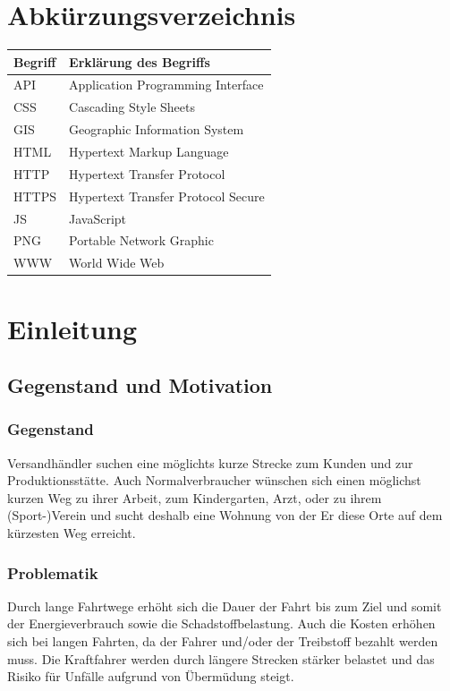 \documentclass[a4paper, 12pt]{scrreprt}
\begin{document}
\chapter*{Abkürzungsverzeichnis}
\begin{tabularx}{\textwidth}{lX}
\toprule
\textrm{Begriff}                &\textrm{Erklärung des Begriffs}\\
\midrule
API		&Application Programming Interface\\
CSS		&Cascading Style Sheets\\
GIS		&Geographic Information System \\
HTML	&Hypertext Markup Language\\
HTTP	&Hypertext Transfer Protocol\\
HTTPS	&Hypertext Transfer Protocol Secure\\
JS		&JavaScript\\
PNG		&Portable Network Graphic\\
WWW		&World Wide Web\\

\bottomrule
\end{tabularx}

\chapter{Einleitung}
\section{Gegenstand und Motivation}
\subsection{Gegenstand}
Versandhändler suchen eine möglichts kurze Strecke zum Kunden und zur Produktionsstätte.
Auch Normalverbraucher wünschen sich einen möglichst kurzen Weg zu ihrer Arbeit, zum Kindergarten, Arzt, oder zu ihrem (Sport-)Verein und sucht deshalb eine Wohnung von der Er diese Orte auf dem kürzesten Weg erreicht.
\subsection{Problematik}
Durch lange Fahrtwege erhöht sich die Dauer der Fahrt bis zum Ziel und somit der Energieverbrauch sowie die Schadstoffbelastung.
Auch die Kosten erhöhen sich bei langen Fahrten, da der Fahrer und/oder der Treibstoff bezahlt werden muss.
Die Kraftfahrer werden durch längere Strecken stärker belastet und das Risiko für Unfälle aufgrund von Übermüdung steigt.\cite{hoffmann1966belastung}
\end{document}
